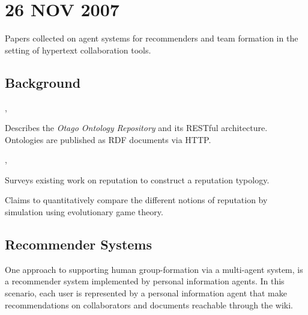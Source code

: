 %
%

%
%
%
%

\chapter{26 NOV 2007}
\label{cha:read_2007_11_26:26-nov-2007}

Papers collected on agent systems for recommenders and team formation in
the setting of hypertext collaboration tools.

%
%
%

\section{Background}
\label{sec:read_2007_11_26:backgr}

%

\begin{albResearchNote}{%
    \citet{pan03:_light_ontol_repos}%
  }{%
    , %
  }
\item Describes the \emph{Otago Ontology Repository} and its RESTful
  architecture.  Ontologies are published as RDF documents via HTTP.
\end{albResearchNote}

%

\begin{albResearchNote}{%
    \citet{mui02:_notion_reput_multi_agent_system}%
  }{%
    , %
  }
\item Surveys existing work on reputation to construct a reputation
  typology.
\item Claims to quantitatively compare the different notions of
  reputation by simulation using evolutionary game theory.
\end{albResearchNote}

%
%
%

\section{Recommender Systems}
\label{sec:read_2007_11_26:recomm-syst}

One approach to supporting human group-formation via a multi-agent
system, is a recommender system implemented by personal information
agents.  In this scenario, each user is represented by a personal
information agent that make recommendations on collaborators and
documents reachable through the wiki.

